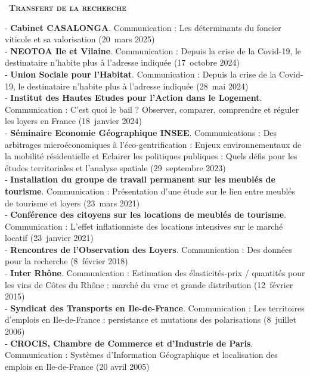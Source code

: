 \documentclass[a4paper,12pt]{article}
\newcommand{\smalltitre}[1]{%
	\noindent \textbullet~\textsc{\textbf{#1}}
	\smallskip
	}
\begin{document}
\newpage

\smalltitre{Transfert de la recherche} \medskip

\noindent 
- \textbf{Cabinet CASALONGA}. Communication : \og{}Les déterminants du foncier viticole et sa valorisation\fg{} (20~mars 2025) \\
- \textbf{NEOTOA Ile et Vilaine}. Communication : \og{}Depuis la crise de la Covid-19, le destinataire n'habite plus à  l'adresse indiquée\fg{} (17~octobre 2024) \\
- \textbf{Union Sociale pour l'Habitat}. Communication : \og{}Depuis la crise de la Covid-19, le destinataire n'habite plus à  l'adresse indiquée\fg{} (28~mai 2024) \\
- \textbf{Institut des Hautes Etudes pour l'Action dans le Logement}. Communication : \og{}C'est quoi le bail ? Observer, comparer, comprendre et réguler les loyers en France\fg{} (18~janvier 2024) \\
- \textbf{Séminaire Economie Géographique INSEE}. Communications : \og{}Des arbitrages microéconomiques à l'éco-gentrification : Enjeux environnementaux de la mobilité résidentielle\fg{}  et \og{}Eclairer les politiques publiques : Quels défis pour les études territoriales et l'analyse spatiale\fg{} (29~septembre 2023) \\
- \textbf{Installation du groupe de travail permanent sur les meublés de tourisme}. Communication : \og{}Présentation d'une étude sur le lien entre meublés de tourisme et loyers\fg{} (23~mars 2021) \\
- \textbf{Conférence des citoyens sur les locations de meublés de tourisme}. Communication : \og{}L'effet inflationniste des locations intensives sur le marché locatif\fg{} (23~janvier 2021) \\
- \textbf{Rencontres de l'Observation des Loyers}. Communication : \og{}Des données pour la recherche\fg{} (8~février 2018) \\
- \textbf{Inter Rhône}. Communication : \og{}Estimation des élasticités-prix / quantités pour les vins de Côtes du Rhône : marché du vrac et grande distribution\fg{} (12~février 2015) \\
- \textbf{Syndicat des Transports en Ile-de-France}. Communication : \og{}Les territoires d'emplois en Ile-de-France : persistance et mutations des polarisations\fg{} (8~juillet 2006) \\
- \textbf{CROCIS, Chambre de Commerce et d'Industrie de Paris}. Communication : \og{}Systèmes d'Information Géographique et localisation des emplois en Ile-de-France\fg{} (20 avril 2005) \\
\end{document}
